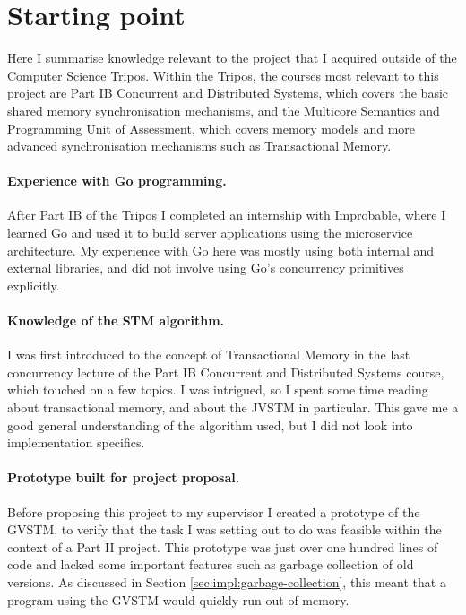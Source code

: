 \documentclass[12pt,a4paper,oneside,openright]{report}
\begin{document}
\section{Starting point}
\label{sec:prep:starting-point}

Here I summarise knowledge relevant to the project that I acquired
outside of the Computer Science Tripos. Within the Tripos, the courses
most relevant to this project are Part IB Concurrent and Distributed
Systems, which covers the basic shared memory synchronisation
mechanisms, and the Multicore Semantics and Programming Unit of
Assessment, which covers memory models and more advanced
synchronisation mechanisms such as Transactional Memory.

\paragraph{Experience with Go programming.} After Part IB of the
Tripos I completed an internship with Improbable, where I learned Go
and used it to build server applications using the microservice
architecture. My experience with Go here was mostly using both
internal and external libraries, and did not involve using Go's
concurrency primitives explicitly.

\paragraph{Knowledge of the STM algorithm.} I was first introduced to
the concept of Transactional Memory in the last concurrency lecture of
the Part IB Concurrent and Distributed Systems course, which touched
on a few topics. I was intrigued, so I spent some time reading about
transactional memory, and about the JVSTM in particular. This gave me
a good general understanding of the algorithm used, but I did not look
into implementation specifics.

\paragraph{Prototype built for project proposal.} Before proposing
this project to my supervisor I created a prototype of the GVSTM, to
verify that the task I was setting out to do was feasible within the
context of a Part II project. This prototype was just over one hundred
lines of code and lacked some important features such as garbage
collection of old versions. As discussed in Section
\ref{sec:impl:garbage-collection}, this meant that a program using the
GVSTM would quickly run out of memory.
\end{document}
